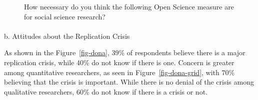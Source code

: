 \documentclass[
  letterpaper,
]{article}
\makeatletter
\let\oldparagraph\paragraph
\renewcommand{\paragraph}{
    \@ifstar
      \xxxParagraphStar
      \xxxParagraphNoStar
  }
\newcommand{\xxxParagraphStar}[1]{\oldparagraph*{#1}\mbox{}}
\newcommand{\xxxParagraphNoStar}[1]{\oldparagraph{#1}\mbox{}}
\makeatother
\begin{document}
\begin{figure}


\caption{\label{fig-val}How necessary do you think the following Open
Science measure are for social science research?}

\end{figure}%

\paragraph{b. Attitudes about the Replication
Crisis}\label{b.-attitudes-about-the-replication-crisis}

As shown in the Figure~\ref{fig-dona}, 39\% of respondents believe there
is a major replication crisis, while 40\% do not know if there is one.
Concern is greater among quantitative researchers, as seen in
Figure~\ref{fig-dona-grid}, with 70\% believing that the crisis is
important. While there is no denial of the crisis among qualitative
researchers, 60\% do not know if there is a crisis or not.
\end{document}
